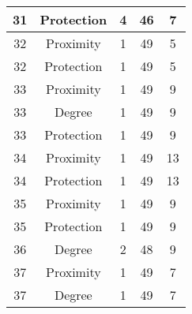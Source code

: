 \documentclass[results.tex]{subfiles}
\begin{document}
\begin{center}
\begin{tabular}{| c || c | c | c | c |}
            \hline
            31                      & Protection                   & 4                      & 46                      & 7                    \\
            \hline
            32                      & Proximity                    & 1                      & 49                      & 5                    \\
            \hline
            32                      & Protection                   & 1                      & 49                      & 5                    \\
            \hline
            33                      & Proximity                    & 1                      & 49                      & 9                    \\
            \hline
            33                      & Degree                       & 1                      & 49                      & 9                    \\
            \hline
            33                      & Protection                   & 1                      & 49                      & 9                    \\
            \hline
            34                      & Proximity                    & 1                      & 49                      & 13                   \\
            \hline
            34                      & Protection                   & 1                      & 49                      & 13                   \\
            \hline
            35                      & Proximity                    & 1                      & 49                      & 9                    \\
            \hline
            35                      & Protection                   & 1                      & 49                      & 9                    \\
            \hline
            36                      & Degree                       & 2                      & 48                      & 9                    \\
            \hline
            37                      & Proximity                    & 1                      & 49                      & 7                    \\
            \hline
            37                      & Degree                       & 1                      & 49                      & 7                    \\

\end{tabular}
\end{center}
\end{document}
